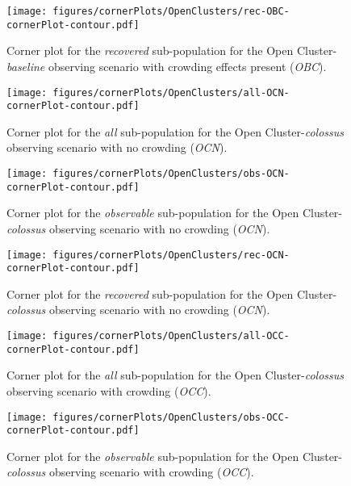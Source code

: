 \documentclass[twocolumn]{aastex63}
\begin{document}
\begin{figure}
    \centering
    \texttt{[image: figures/cornerPlots/OpenClusters/rec-OBC-cornerPlot-contour.pdf]}
    \caption{Corner plot for the \textit{recovered} sub-population for the Open Cluster-\textit{baseline} observing scenario with crowding effects present (\textit{OBC}).}
    \label{fig:obc-rec-corner-plot-appendix}
\end{figure}\clearpage

\begin{figure}
    \centering
    \texttt{[image: figures/cornerPlots/OpenClusters/all-OCN-cornerPlot-contour.pdf]}
    \caption{Corner plot for the \textit{all} sub-population for the Open Cluster-\textit{colossus} observing scenario with no crowding (\textit{OCN}).}
    \label{fig:ocn-All-corner-plot-appendix}
\end{figure}\clearpage

\begin{figure}
    \centering
    \texttt{[image: figures/cornerPlots/OpenClusters/obs-OCN-cornerPlot-contour.pdf]}
    \caption{Corner plot for the \textit{observable} sub-population for the Open Cluster-\textit{colossus} observing scenario with no crowding (\textit{OCN}).}
    \label{fig:ocn-Obs-corner-plot-appendix}
\end{figure}\clearpage

\begin{figure}
    \centering
    \texttt{[image: figures/cornerPlots/OpenClusters/rec-OCN-cornerPlot-contour.pdf]}
    \caption{Corner plot for the \textit{recovered} sub-population for the Open Cluster-\textit{colossus} observing scenario with no crowding (\textit{OCN}).}
    \label{fig:ocn-Rec-corner-plot-appendix}
\end{figure}\clearpage

\begin{figure}
    \centering
    \texttt{[image: figures/cornerPlots/OpenClusters/all-OCC-cornerPlot-contour.pdf]}
    \caption{Corner plot for the \textit{all} sub-population for the Open Cluster-\textit{colossus} observing scenario with crowding (\textit{OCC}).}
    \label{fig:occ-All-corner-plot-appendix}
\end{figure}\clearpage

\begin{figure}
    \centering
    \texttt{[image: figures/cornerPlots/OpenClusters/obs-OCC-cornerPlot-contour.pdf]}
    \caption{Corner plot for the \textit{observable} sub-population for the Open Cluster-\textit{colossus} observing scenario with crowding (\textit{OCC}).}
    \label{fig:occ-Obs-corner-plot-appendix}
\end{figure}\clearpage
\end{document}
